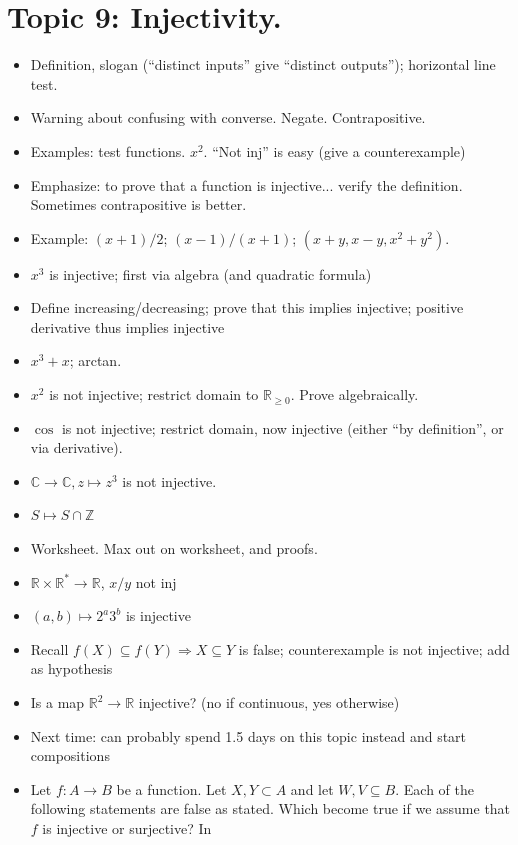 \documentclass[12pt]{article}
\newcommand{\Z}{{\mathbb Z}}
\newcommand{\C}{{\mathbb C}}
\newcommand{\R}{{\mathbb R}}
\begin{document}
\newpage
\section[9 (\csname dateWeek9\endcsname): Injectivity.]{Topic  9: Injectivity.}


\begin{itemize}
\item Definition, slogan (``distinct inputs'' give ``distinct outputs''); horizontal line test.
\item Warning about confusing with converse. Negate. Contrapositive.
\item Examples: test functions. $x^2$. ``Not inj'' is easy (give a counterexample)
\item Emphasize: to prove that a function is injective... verify the definition. Sometimes contrapositive is better.
\item Example: $(x+1)/2$; $(x-1)/(x+1)$; $(x+y,x-y,x^2 + y^2)$.
\item $x^3$ is injective; first via algebra (and quadratic formula)
\item Define increasing/decreasing; prove that this implies injective; positive derivative thus implies injective
\item $x^3 + x$; arctan.
\item $x^2$ is not injective; restrict domain to $\R_{\geq 0}$. Prove algebraically.
\item $\cos$ is not injective; restrict domain, now injective (either ``by definition'', or via derivative).
\item $\C \to \C, z \mapsto z^3$ is not injective.
\item $S \mapsto S \cap \Z$
\item Worksheet. Max out on worksheet, and proofs. 
\item $\R \times \R^* \to \R$, $x/y$ not inj
\item $(a,b) \mapsto 2^a3^b$ is injective
\item Recall $f(X) \subseteq f(Y) \Rightarrow X \subseteq Y$ is false; counterexample is not injective; add as hypothesis
\item Is a map $\R^2 \to \R$ injective? (no if continuous, yes otherwise)
\item Next time: can probably spend 1.5 days on this topic instead and start compositions
\item Let $f\colon A \to B$ be a function. Let $X,Y \subset
  A$ and let $W,V \subseteq B$. Each of the following statements are false as stated. Which
  become true if we assume that $f$ is injective or surjective? In

\end{itemize}
\end{document}

